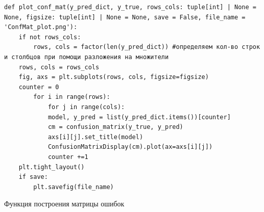 \documentclass[../document.tex]{subfiles}
\begin{document}
 		\begin{listing}[H]
 		\begin{verbatim}
def plot_conf_mat(y_pred_dict, y_true, rows_cols: tuple[int] | None = None, figsize: tuple[int] | None = None, save = False, file_name = 'ConfMat_plot.png'):
	if not rows_cols:
		rows, cols = factor(len(y_pred_dict)) #определяем кол-во строк и столбцов при помощи разложения на множители
	rows, cols = rows_cols
	fig, axs = plt.subplots(rows, cols, figsize=figsize)
	counter = 0
		for i in range(rows):
			for j in range(cols):
			model, y_pred = list(y_pred_dict.items())[counter]
			cm = confusion_matrix(y_true, y_pred)
			axs[i][j].set_title(model)
			ConfusionMatrixDisplay(cm).plot(ax=axs[i][j])
			counter +=1
	plt.tight_layout()
	if save:
		plt.savefig(file_name)
 		\end{verbatim}
 		\caption{\label{sample2}Функция построения матрицы ошибок}
 		\end{listing}
 		
\end{document}
